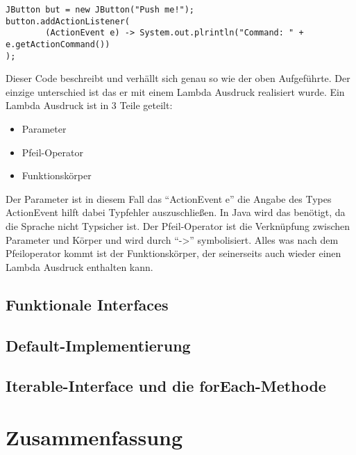\pagebreak

\begin{lstlisting}
JButton but = new JButton("Push me!");
button.addActionListener(
		(ActionEvent e) -> System.out.plrintln("Command: " + e.getActionCommand())
);
\end{lstlisting}
Dieser Code beschreibt und verhällt sich genau so wie der oben Aufgeführte. Der
einzige unterschied ist das er mit einem Lambda Ausdruck realisiert wurde.
Ein Lambda Ausdruck ist in 3 Teile geteilt:
\begin{itemize}
	\item Parameter
	\item Pfeil-Operator
	\item Funktionskörper
\end{itemize}

Der Parameter ist in diesem Fall das "`ActionEvent e"' die Angabe des Types
ActionEvent hilft dabei Typfehler auszuschließen. In Java wird das benötigt, da
die Sprache nicht Typsicher ist. Der Pfeil-Operator ist die Verknüpfung zwischen
Parameter und Körper und wird durch "`->"' symbolisiert. Alles was nach dem
Pfeiloperator kommt ist der Funktionskörper, der seinerseits auch wieder einen
Lambda Ausdruck enthalten kann.

\section{Funktionale Interfaces}
\label{sec:FI}

\section{Default-Implementierung}
\label{sec:DI}

\section{Iterable-Interface und die forEach-Methode}
\label{sec:IIufEM}

\chapter{Zusammenfassung}
\label{sec:Fazit}